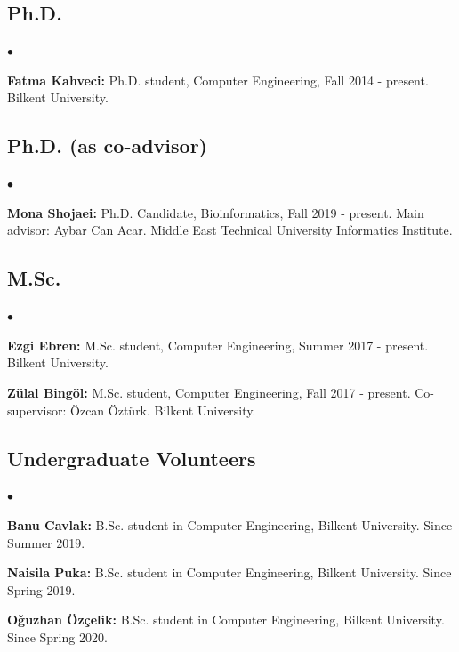 \documentclass[margin,line]{res}
\newenvironment{list2}{
  \begin{list}{$\bullet$}{%
      \setlength{\itemsep}{0.1cm}
      \setlength{\parsep}{0in} \setlength{\parskip}{0in}
      \setlength{\topsep}{0in} \setlength{\partopsep}{0in} 
      \setlength{\leftmargin}{0.2in}}}{\end{list}}
\begin{document}
\begin{resume}
\subsection{\small \sc Ph.D.}
\begin{list2}
\item
  {\bf Fatma Kahveci:} Ph.D. student, Computer Engineering, Fall 2014 - present.
  Bilkent University.
\end{list2}
\vspace*{-.4cm}
\subsection{\small \sc Ph.D. (as co-advisor)}
\begin{list2}
\item
{\bf Mona Shojaei:} Ph.D. Candidate, Bioinformatics,  Fall 2019 - present.
Main advisor: Aybar Can Acar.
  Middle East Technical University Informatics Institute.
\end{list2}
\vspace*{-.4cm}
\subsection{\small \sc M.Sc.}
\begin{list2}
\item
  {\bf Ezgi Ebren:} M.Sc. student, Computer Engineering, Summer 2017 - present.
  Bilkent University. 
\item
  {\bf Zülal Bingöl:} M.Sc. student, Computer Engineering, Fall 2017 - present. Co-supervisor: Özcan Öztürk.
  Bilkent University.
\end{list2}

\vspace*{-.4cm}
  \subsection{\small \sc Undergraduate Volunteers}
  \begin{list2}
\item {\bf Banu Cavlak:} B.Sc. student in Computer Engineering,  Bilkent University. Since Summer 2019.
\item {\bf Naisila Puka:} B.Sc. student in Computer Engineering,  Bilkent University. Since Spring 2019.
\item {\bf Oğuzhan Özçelik:} B.Sc. student in Computer Engineering,  Bilkent University. Since Spring 2020.
    \end{list2}



\end{resume}
\end{document}
